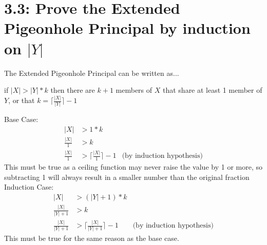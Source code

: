 \documentclass{article}
\begin{document}
\section*{3.3: Prove the Extended Pigeonhole Principal by induction on $|Y|$}
The Extended Pigeonhole Principal can be written as...
\begin{center}
  if $|X| > |Y| * k$ then there are $k + 1$ members of $X$ that share at least 1 member of $Y$, or that $k = \lceil \frac{|X|}{|Y|} \rceil - 1$ 
\end{center}
Base Case:
\begin{align*}
  |X| &> 1 * k \\
  \frac{|X|}{1} &> k \\
  \frac{|X|}{1} &> \lceil \frac{|X|}{1} \rceil - 1 & \textrm{(by induction hypothesis)} 
\end{align*}
This must be true as a ceiling function may never raise the value by 1 or more, so subtracting 1 will always result in a smaller number than the original fraction \\
Induction Case:
\begin{align*}
  |X| &> (|Y| + 1) * k \\
  \frac{|X|}{|Y| + 1} &> k \\
  \frac{|X|}{|Y| + 1} &> \lceil \frac{|X|}{|Y| + 1} \rceil - 1 & \textrm{(by induction hypothesis)}
\end{align*}
This must be true for the same reason as the base case.
\end{document}
